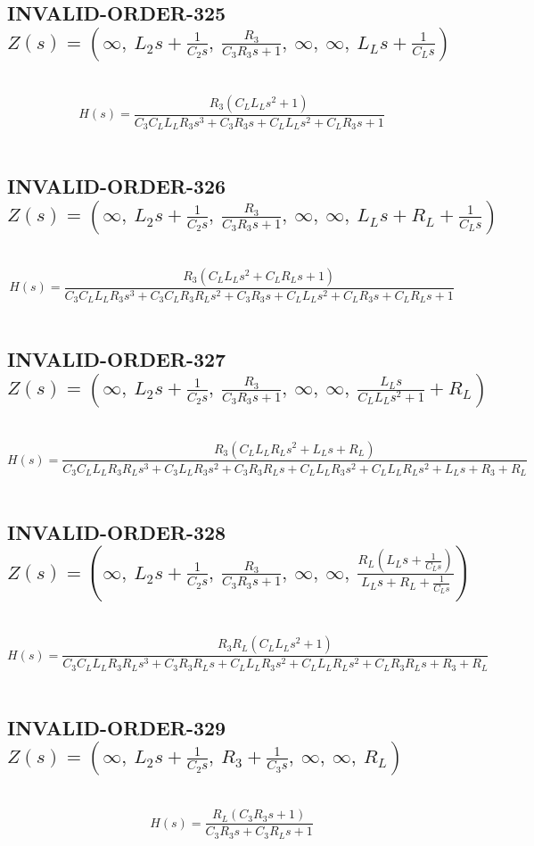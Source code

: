 \documentclass{article}
\begin{document}
\subsection{INVALID-ORDER-325 $Z(s) = \left( \infty, \  L_{2} s + \frac{1}{C_{2} s}, \  \frac{R_{3}}{C_{3} R_{3} s + 1}, \  \infty, \  \infty, \  L_{L} s + \frac{1}{C_{L} s}\right)$ } \ 
\textbf{\[H(s) = \frac{R_{3} \left(C_{L} L_{L} s^{2} + 1\right)}{C_{3} C_{L} L_{L} R_{3} s^{3} + C_{3} R_{3} s + C_{L} L_{L} s^{2} + C_{L} R_{3} s + 1}\] } \ 
\subsection{INVALID-ORDER-326 $Z(s) = \left( \infty, \  L_{2} s + \frac{1}{C_{2} s}, \  \frac{R_{3}}{C_{3} R_{3} s + 1}, \  \infty, \  \infty, \  L_{L} s + R_{L} + \frac{1}{C_{L} s}\right)$ } \ 
\textbf{\[H(s) = \frac{R_{3} \left(C_{L} L_{L} s^{2} + C_{L} R_{L} s + 1\right)}{C_{3} C_{L} L_{L} R_{3} s^{3} + C_{3} C_{L} R_{3} R_{L} s^{2} + C_{3} R_{3} s + C_{L} L_{L} s^{2} + C_{L} R_{3} s + C_{L} R_{L} s + 1}\] } \ 
\subsection{INVALID-ORDER-327 $Z(s) = \left( \infty, \  L_{2} s + \frac{1}{C_{2} s}, \  \frac{R_{3}}{C_{3} R_{3} s + 1}, \  \infty, \  \infty, \  \frac{L_{L} s}{C_{L} L_{L} s^{2} + 1} + R_{L}\right)$ } \ 
\textbf{\[H(s) = \frac{R_{3} \left(C_{L} L_{L} R_{L} s^{2} + L_{L} s + R_{L}\right)}{C_{3} C_{L} L_{L} R_{3} R_{L} s^{3} + C_{3} L_{L} R_{3} s^{2} + C_{3} R_{3} R_{L} s + C_{L} L_{L} R_{3} s^{2} + C_{L} L_{L} R_{L} s^{2} + L_{L} s + R_{3} + R_{L}}\] } \ 
\subsection{INVALID-ORDER-328 $Z(s) = \left( \infty, \  L_{2} s + \frac{1}{C_{2} s}, \  \frac{R_{3}}{C_{3} R_{3} s + 1}, \  \infty, \  \infty, \  \frac{R_{L} \left(L_{L} s + \frac{1}{C_{L} s}\right)}{L_{L} s + R_{L} + \frac{1}{C_{L} s}}\right)$ } \ 
\textbf{\[H(s) = \frac{R_{3} R_{L} \left(C_{L} L_{L} s^{2} + 1\right)}{C_{3} C_{L} L_{L} R_{3} R_{L} s^{3} + C_{3} R_{3} R_{L} s + C_{L} L_{L} R_{3} s^{2} + C_{L} L_{L} R_{L} s^{2} + C_{L} R_{3} R_{L} s + R_{3} + R_{L}}\] } \ 
\subsection{INVALID-ORDER-329 $Z(s) = \left( \infty, \  L_{2} s + \frac{1}{C_{2} s}, \  R_{3} + \frac{1}{C_{3} s}, \  \infty, \  \infty, \  R_{L}\right)$ } \ 
\textbf{\[H(s) = \frac{R_{L} \left(C_{3} R_{3} s + 1\right)}{C_{3} R_{3} s + C_{3} R_{L} s + 1}\] } \ 
\end{document}
